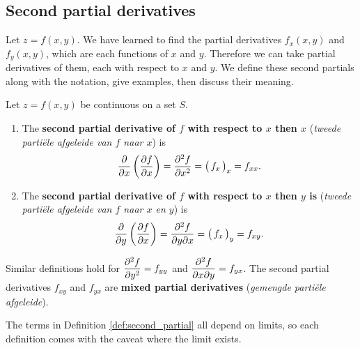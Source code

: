 \subsection{Second partial derivatives}
Let $z=f(x,y)$. We have learned to find the partial derivatives $f_x(x,y)$ and $f_y(x,y)$, which are each functions of $x$ and $y$. Therefore we can take partial derivatives of them, each with respect to $x$ and $y$. We define these second partials along with the notation, give examples, then discuss their meaning.

\ifanalysis\pagebreak\fi
\begin{definition}\label{def:second_partial}
Let $z=f(x,y)$ be continuous on a set $S$.
\begin{enumerate}
	\item The \textbf{second partial derivative of $f$ with respect to $x$ then $x$} (\textit{tweede parti\"ele afgeleide van $f$ naar $x$}) is $$\frac{\partial}{\partial x}\left(\frac{\partial f}{\partial x}\right) = \frac{\partial^2 f}{\partial x^2} = \big(\,f_x\,\big)_x = f_{xx}.$$

\item The \textbf{second partial derivative of $f$ with respect to $x$ then $y$ is} (\textit{tweede parti\"ele afgeleide van $f$ naar $x$ en $y$})  is $$\frac{\partial}{\partial y}\left(\frac{\partial f}{\partial x}\right) = \frac{\partial^2f}{\partial y\partial x} = \big(\,f_x\,\big)_y = f_{xy}.$$
\end{enumerate}
Similar definitions hold for $\displaystyle \frac{\partial^2f}{\partial y^2} = f_{yy}$ and $\displaystyle \frac{\partial^2f}{\partial x\partial y} = f_{yx}$. 
The second partial derivatives $f_{xy}$ and $f_{yx}$ are \textbf{mixed partial derivatives} (\textit{gemengde parti\"ele afgeleide}).
\end{definition}

The terms in Definition \ref{def:second_partial} all depend on limits, so each definition comes with the caveat where the limit exists.

